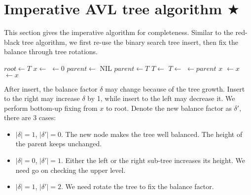 \documentclass[b5paper]{article}
\begin{document}
\begin{Exercise}
\end{Exercise}

\section{Imperative AVL tree algorithm $\bigstar$}

This section gives the imperative algorithm for completeness. Similar to the red-black tree algorithm, we first re-use the binary search tree insert, then fix the balance through tree rotations.

\begin{algorithmic}[1]
  \State $root \gets T$
  \State $x \gets$ 
  \State {} $\gets 0$
  \State $parent \gets$ NIL
    \State $parent \gets T$
      \State $T \gets $ 
    \Else
      \State $T \gets $ 
    \EndIf
  \EndWhile
  \State {} $\gets parent$
   
    \State \Return $x$
    \State {} $\gets x$
  \Else
    \State {} $\gets x$
  \EndIf
  \State \Return {}
\EndFunction
\end{algorithmic}

After insert, the balance factor $\delta$ may change because of the tree growth. Insert to the right may increase $\delta$ by 1, while insert to the left may decrease it. We perform bottom-up fixing from $x$ to root. Denote the new balance factor as $\delta'$, there are 3 cases:

\begin{itemize}
\item $|\delta| = 1$, $|\delta'| = 0$. The new node makes the tree well balanced. The height of the parent keeps unchanged.

\item $|\delta| = 0$, $|\delta'| = 1$. Either the left or the right sub-tree increases its height. We need go on checking the upper level.

\item $|\delta| = 1$, $|\delta'| = 2$. We need rotate the tree to fix the balance factor.
\end{itemize}
\end{document}
